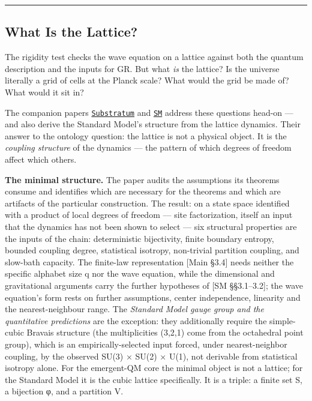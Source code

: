 \documentclass[
]{article}
\begin{document}
\begin{center}\rule{0.5\linewidth}{0.5pt}\end{center}

\hypertarget{what-is-the-lattice}{%
\subsection{What Is the Lattice?}\label{what-is-the-lattice}}

The rigidity test checks the wave equation on a lattice against both the
quantum description and the inputs for GR. But what \emph{is} the
lattice? Is the universe literally a grid of cells at the Planck scale?
What would the grid be made of? What would it sit in?

The companion papers \href{Substratum.md}{\texttt{Substratum}} and
\href{SM.md}{\texttt{SM}} address these questions head-on --- and also
derive the Standard Model's structure from the lattice dynamics. Their
answer to the ontology question: the lattice is not a physical object.
It is the \emph{coupling structure} of the dynamics --- the pattern of
which degrees of freedom affect which others.

\textbf{The minimal structure.} The paper audits the assumptions its
theorems consume and identifies which are necessary for the theorems and
which are artifacts of the particular construction. The result: on a
state space identified with a product of local degrees of freedom ---
site factorization, itself an input that the dynamics has not been shown
to select --- six structural properties are the inputs of the chain:
deterministic bijectivity, finite boundary entropy, bounded coupling
degree, statistical isotropy, non-trivial partition coupling, and
slow-bath capacity. The finite-law representation {[}Main §3.4{]} needs
neither the specific alphabet size q nor the wave equation, while the
dimensional and gravitational arguments carry the further hypotheses of
{[}SM §§3.1--3.2{]}; the wave equation's form rests on further
assumptions, center independence, linearity and the nearest-neighbour
range. The \emph{Standard Model gauge group and the quantitative
predictions} are the exception: they additionally require the
simple-cubic Bravais structure (the multiplicities (3,2,1) come from the
octahedral point group), which is an empirically-selected input forced,
under nearest-neighbor coupling, by the observed SU(3) × SU(2) × U(1),
not derivable from statistical isotropy alone. For the emergent-QM core
the minimal object is not a lattice; for the Standard Model it is the
cubic lattice specifically. It is a triple: a finite set S, a bijection
φ, and a partition V.
\end{document}
